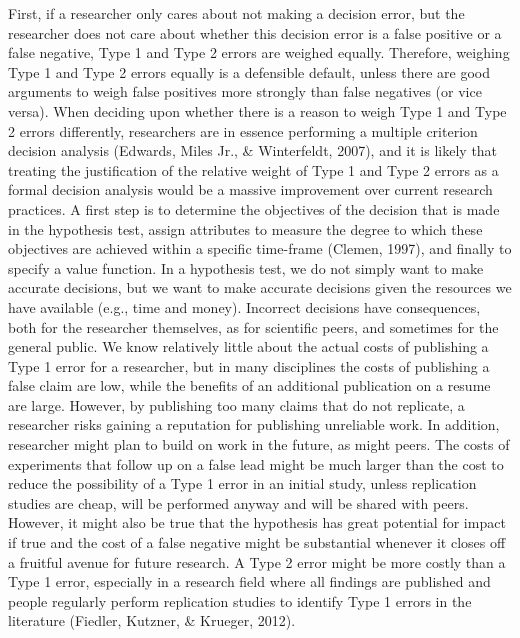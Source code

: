 \documentclass[
  english,
  ,man, a4paper,floatsintext]{apa6}
\begin{document}
First, if a researcher only cares about not making a decision error, but the researcher does not care about whether this decision error is a false positive or a false negative, Type 1 and Type 2 errors are weighed equally. Therefore, weighing Type 1 and Type 2 errors equally is a defensible default, unless there are good arguments to weigh false positives more strongly than false negatives (or vice versa). When deciding upon whether there is a reason to weigh Type 1 and Type 2 errors differently, researchers are in essence performing a multiple criterion decision analysis (Edwards, Miles Jr., \& Winterfeldt, 2007), and it is likely that treating the justification of the relative weight of Type 1 and Type 2 errors as a formal decision analysis would be a massive improvement over current research practices. A first step is to determine the objectives of the decision that is made in the hypothesis test, assign attributes to measure the degree to which these objectives are achieved within a specific time-frame (Clemen, 1997), and finally to specify a value function.
In a hypothesis test, we do not simply want to make accurate decisions, but we want to make accurate decisions given the resources we have available (e.g., time and money). Incorrect decisions have consequences, both for the researcher themselves, as for scientific peers, and sometimes for the general public. We know relatively little about the actual costs of publishing a Type 1 error for a researcher, but in many disciplines the costs of publishing a false claim are low, while the benefits of an additional publication on a resume are large. However, by publishing too many claims that do not replicate, a researcher risks gaining a reputation for publishing unreliable work. In addition, researcher might plan to build on work in the future, as might peers. The costs of experiments that follow up on a false lead might be much larger than the cost to reduce the possibility of a Type 1 error in an initial study, unless replication studies are cheap, will be performed anyway and will be shared with peers. However, it might also be true that the hypothesis has great potential for impact if true and the cost of a false negative might be substantial whenever it closes off a fruitful avenue for future research. A Type 2 error might be more costly than a Type 1 error, especially in a research field where all findings are published and people regularly perform replication studies to identify Type 1 errors in the literature (Fiedler, Kutzner, \& Krueger, 2012).
\end{document}
